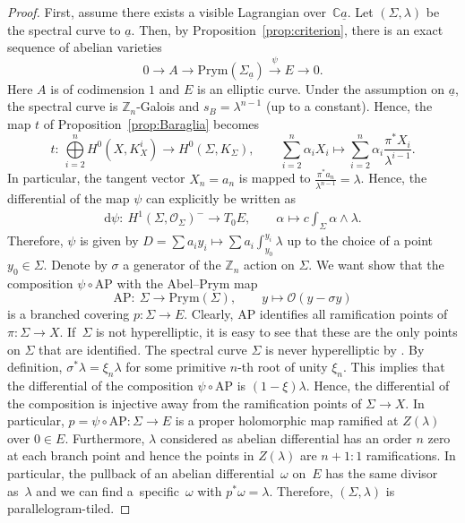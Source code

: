 \documentclass[pdftex]{sigma}
\numberwithin{equation}{section}
\theoremstyle{definition}
\renewcommand{\to}{\rightarrow}
\newcommand{\calO}{\mathcal{O}}
\newcommand{\ZZ}{\mathbb{Z}}
\newcommand{\CC}{\mathbb{C}}
\renewcommand{\d}{\mathrm{d}}
\newcommand{\Prym}{\mathrm{Prym}}
\begin{document}
\begin{proof}
 First, assume there exists a visible Lagrangian over~$\CC\underline{a}$. Let $(\Sigma,\lambda)$ be the spectral curve to $\underline{a}$. Then, by Proposition~\ref{prop:criterion}, there is an exact sequence of abelian varieties
 \[ 0 \to A \to \Prym(\Sigma_{\underline{a}}) \xrightarrow{\psi} E \to 0.
 \]
 Here $A$ is of codimension $1$ and $E$ is an elliptic curve. Under the assumption on $\underline{a}$, the spectral curve is $\ZZ_n$-Galois and $s_B=\lambda^{n-1}$ (up to a constant). Hence, the map $t$ of Proposition~\ref{prop:Baraglia} becomes
 \[ t\colon \ \bigoplus\limits_{i=2}^n H^0(X,K_X^i) \to H^0(\Sigma,K_\Sigma), \qquad \sum\limits_{i=2}^n \alpha_i X_i \mapsto \sum\limits_{i=2}^n \alpha_i \frac{\pi^*X_i}{\lambda^{i-1}}.
 \] In particular, the tangent vector $X_n=a_n$ is mapped to $\frac{\pi^*a_n}{\lambda^{n-1}}=\lambda$.
 Hence, the differential of the map $\psi$ can explicitly be written as
 \begin{align} \d \psi\colon \ H^1(\Sigma, \calO_\Sigma)^- \to T_0E, \qquad \alpha \mapsto c \int_\Sigma \alpha \wedge \lambda. \label{one-form}
 \end{align}
 Therefore, $\psi$ is given by $D=\sum a_i y_i \mapsto \sum a_i\int_{y_0}^{y_i} \lambda$ up to the choice of a point $y_0 \in \Sigma$. Denote by $\sigma$ a generator of the $\ZZ_n$ action on $\Sigma$. We want show that the composition $\psi \circ \mathrm{AP}$ with the Abel--Prym map
 \[ \mathrm{AP}\colon \ \Sigma \to \Prym(\Sigma), \qquad y \mapsto \calO(y-\sigma y)
 \]
 is a branched covering $p\colon \Sigma \to E$. Clearly, $\mathrm{AP}$ identifies all ramification points of $\pi\colon \Sigma \to X$. If~$\Sigma$ is not hyperelliptic, it is easy to see that these are the only points on $\Sigma$ that are identified. The spectral curve $\Sigma$ is never hyperelliptic by \cite[Lemma~4.1]{Baraglia}. By definition, $\sigma^*\lambda=\xi_n \lambda$ for some primitive $n$-th root of unity $\xi_n$. This implies that the differential of the composition $\psi \circ \mathrm{AP}$ is $(1-\xi) \lambda$. Hence, the differential of the composition is injective away from the ramification points of $\Sigma \to X$. In particular, $p=\psi \circ \mathrm{AP}\colon \Sigma \to E$ is a proper holomorphic map ramified at $Z(\lambda)$ over $0 \in E$. Furthermore, $\lambda$ considered as abelian differential has an order $n$ zero at each branch point and hence the points in $Z(\lambda)$ are $n+1:1$ ramifications. In particular, the pullback of an abelian differential~$\omega$ on~$E$ has the same divisor as~$\lambda$ and we can find a~specific~$\omega$ with $p^*\omega=\lambda$. Therefore, $(\Sigma,\lambda)$ is parallelogram-tiled.


\end{proof}
\end{document}
